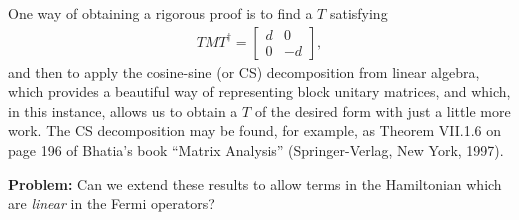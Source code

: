 \documentclass[12pt]{article}
\begin{document}
One way of obtaining a rigorous proof is to find a $T$ satisfying
\begin{eqnarray}
  T M T^\dagger = \left[ \begin{array}{cc} d & 0 \\ 0 & -d \end{array} \right],
\end{eqnarray}
and then to apply the cosine-sine (or CS) decomposition from linear
algebra, which provides a beautiful way of representing block unitary
matrices, and which, in this instance, allows us to obtain a $T$ of
the desired form with just a little more work.  The CS decomposition
may be found, for example, as Theorem VII.1.6 on page 196 of Bhatia's
book ``Matrix Analysis'' (Springer-Verlag, New York, 1997).

\textbf{Problem:} Can we extend these results to allow terms in the
Hamiltonian which are \emph{linear} in the Fermi operators?



\end{document}
